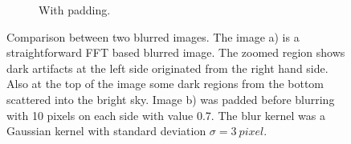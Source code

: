 \documentclass{juliacon}
\begin{document}
\begin{figure}[h]
\begin{subfigure}[b]{.25\textwidth}
            \centering
            \caption{With padding.}
            \label{fig:withpad}
        \end{subfigure}
        \caption{Comparison between two blurred images. The image a) is a straightforward FFT based blurred image.
        The zoomed region shows dark artifacts at the left side originated from the right hand side. Also at the top of the image some dark regions from
        the bottom scattered into the bright sky.
        Image b) was padded before blurring with 10 pixels on each side with value 0.7. The blur kernel was a Gaussian kernel
        with standard deviation $\sigma=\SI{3}{pixel}$.}
        \label{fig:}
    \end{figure}
     
\end{document}
